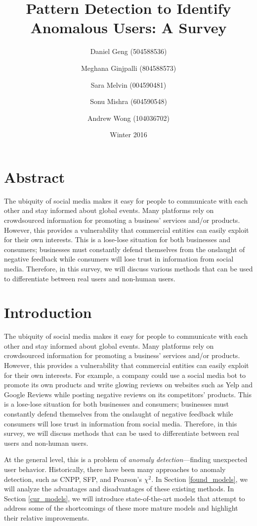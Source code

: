 \documentclass[11pt, oneside]{article}   	%
\title{Pattern Detection to Identify Anomalous Users: A Survey}
\author{
  Daniel Geng (504588536)\\
  \and
  Meghana Ginjpalli (804588573)\\
  \and
  Sara Melvin (004590481)\\
  \and
  Sonu Mishra (604590548)\\
  \and
  Andrew Wong (104036702)
}
\date{Winter 2016}							%
\begin{document}
\maketitle

\section*{Abstract}
The ubiquity of social media makes it easy for people to communicate with each other and stay informed about global events.
Many platforms rely on crowdsourced information for promoting a business' services and/or products.
However, this provides a vulnerability that commercial entities can easily exploit for their own interests. This is a lose-lose situation for both businesses and consumers; businesses must constantly defend themselves from the onslaught of negative feedback while consumers will lose trust in information from social media.
Therefore, in this survey, we will discuss various methods that can be used to differentiate between real users and non-human users.

\section{Introduction} \label{background}

\quad The ubiquity of social media makes it easy for people to communicate with each other and stay informed about global events.
Many platforms rely on crowdsourced information for promoting a business' services and/or products.
However, this provides a vulnerability that commercial entities can easily exploit for their own interests.
For example, a company could use a social media bot to promote its own products and write glowing reviews on websites such as Yelp and Google Reviews while posting negative reviews on its competitors' products.
This is a lose-lose situation for both businesses and consumers; businesses must constantly defend themselves from the onslaught of negative feedback while consumers will lose trust in information from social media.
Therefore, in this survey, we will discuss methods that can be used to differentiate between real users and non-human users.

\quad At the general level, this is a problem of \textit{anomaly detection}---finding unexpected user behavior.
Historically, there have been many approaches to anomaly detection, such as CNPP, SFP, and Pearson's $\chi^2$.
In Section \ref{found_models}, we will analyze the advantages and disadvantages of these existing methods.
In Section \ref{cur_models}, we will introduce state-of-the-art models that attempt to address some of the shortcomings of these more mature models and highlight their relative improvements. 
\end{document}
